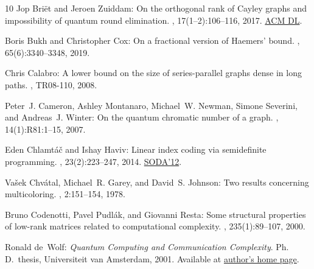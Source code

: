 \begin{thebibliography}{10}
{\sc Jop Bri{\"{e}}t and Jeroen Zuiddam}: On the orthogonal rank of {C}ayley
  graphs and impossibility of quantum round elimination.
, 17(1--2):106--116, 2017.
\newblock \href{https://dl.acm.org/doi/abs/10.5555/3179483.3179489}{ACM DL}.

{\sc Boris Bukh and Christopher Cox}: On a fractional version of {H}aemers'
  bound.
, 65(6):3340--3348, 2019.

{\sc Chris Calabro}: A lower bound on the size of series-parallel graphs dense
  in long paths.
, TR08-110, 2008.

{\sc Peter~J. Cameron, Ashley Montanaro, Michael~W. Newman, Simone Severini,
  and Andreas~J. Winter}: On the quantum chromatic number of a graph.
, 14(1):R81:1--15, 2007.
\newblock [\epfmtdoi{10.37236/999}]

{\sc Eden Chlamt\'a\v{c} and Ishay Haviv}: Linear index coding via semidefinite
  programming.
, 23(2):223--247, 2014.
\newblock \prelim
  \href{https://dl.acm.org/doi/10.5555/2095116.2095151}{SODA'12}.
\newblock [\epfmtdoi{10.1017/S0963548313000564}]

{\sc Va{\v s}ek Chv{\'{a}}tal, Michael~R. Garey, and David~S. Johnson}: Two
  results concerning multicoloring.
, 2:151--154, 1978.
\newblock [\epfmtdoi{10.1016/S0167-5060(08)70329-7}]

{\sc Bruno Codenotti, Pavel Pudl{\'{a}}k, and Giovanni Resta}: Some structural
  properties of low-rank matrices related to computational complexity.
, 235(1):89--107, 2000.

{\sc Ronald de~Wolf}: {\em {\em Quantum Computing and Communication
  Complexity}}.
\newblock Ph.\,D.\ thesis, Universiteit van Amsterdam, 2001.
\newblock Available at
  \href{https://homepages.cwi.nl/~rdewolf/publ/qc/phd.pdf}{author's home page}.


\end{thebibliography}
